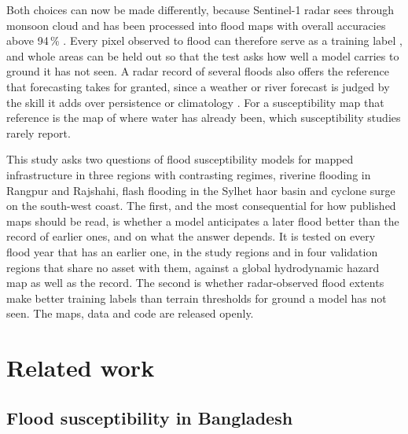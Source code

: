 \documentclass[10pt,a4paper,twocolumn]{article}
\begin{document}
Both choices can now be made differently, because Sentinel-1 radar sees through monsoon cloud and has been processed into flood maps with overall accuracies above 94\,\% \citep{twele2016, uddin2019}. Every pixel observed to flood can therefore serve as a training label \citep{islamr2024}, and whole areas can be held out so that the test asks how well a model carries to ground it has not seen. A radar record of several floods also offers the reference that forecasting takes for granted, since a weather or river forecast is judged by the skill it adds over persistence or climatology \citep{murphy1988, pappenberger2015}. For a susceptibility map that reference is the map of where water has already been, which susceptibility studies rarely report.

This study asks two questions of flood susceptibility models for mapped infrastructure in three regions with contrasting regimes, riverine flooding in Rangpur and Rajshahi, flash flooding in the Sylhet haor basin and cyclone surge on the south-west coast. The first, and the most consequential for how published maps should be read, is whether a model anticipates a later flood better than the record of earlier ones, and on what the answer depends. It is tested on every flood year that has an earlier one, in the study regions and in four validation regions that share no asset with them, against a global hydrodynamic hazard map as well as the record. The second is whether radar-observed flood extents make better training labels than terrain thresholds for ground a model has not seen. The maps, data and code are released openly.

\section{Related work}
\label{sec:related}

\subsection{Flood susceptibility in Bangladesh}
\end{document}
